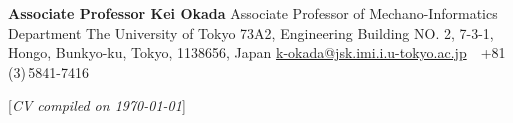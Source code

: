 \documentclass[letterpaper,MMMyyyy,nonstop]{simpleresumecv}
\newcommand{\CVNote}{CV compiled on {\today}}
\begin{document}
\begin{body}
\BigGap
\BulletItem
\textbf{Associate Professor Kei Okada}
\newline
Associate Professor of Mechano-Informatics Department
\newline
The University of Tokyo
\newline
73A2, Engineering Building NO. 2, 7-3-1, Hongo, Bunkyo-ku, Tokyo, 1138656, Japan
\newline
\href{mailto:k-okada@jsk.imi.i.u-tokyo.ac.jp}
{k-okada@jsk.imi.i.u-tokyo.ac.jp}
\,\SubBulletSymbol\,
+81\,(3)\,5841-7416

\end{body}


\UseNoteFont%
\null\hfill%
[\textit{\CVNote}]%
\hspace{2.0mm}\null
\end{document}
